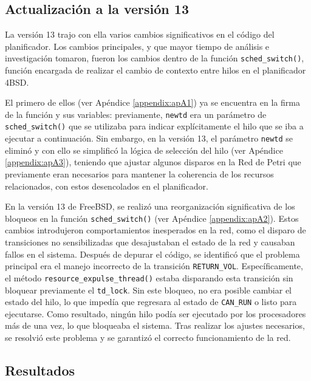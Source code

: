 \subsection{Actualización a la versión 13}

La versión 13 trajo con ella varios cambios significativos en el código del planificador. Los cambios principales, y que mayor tiempo de análisis e investigación tomaron, fueron los cambios dentro de la función \verb|sched_switch()|, función encargada de realizar el cambio de contexto entre hilos en el planificador 4BSD.\par

El primero de ellos (ver Apéndice \ref{appendix:apA1}) ya se encuentra en la firma de la función y sus variables: previamente, \verb|newtd| era un parámetro de \verb|sched_switch()| que se utilizaba para indicar explícitamente el hilo que se iba a ejecutar a continuación. Sin embargo, en la versión 13, el parámetro \verb|newtd| se eliminó y con ello se simplificó la lógica de selección del hilo (ver Apéndice \ref{appendix:apA3}), teniendo que ajustar algunos disparos en la Red de Petri que previamente eran necesarios para mantener la coherencia de los recursos relacionados, con estos desencolados en el planificador.\par

En la versión 13 de FreeBSD, se realizó una reorganización significativa de los bloqueos en la función \verb|sched_switch()| (ver Apéndice \ref{appendix:apA2}). Estos cambios introdujeron comportamientos inesperados en la red, como el disparo de transiciones no sensibilizadas que desajustaban el estado de la red y causaban fallos en el sistema. Después de depurar el código, se identificó que el problema principal era el manejo incorrecto de la transición \verb|RETURN_VOL|. Específicamente, el método \verb|resource_expulse_thread()| estaba disparando esta transición sin bloquear previamente el \verb|td_lock|. Sin este bloqueo, no era posible cambiar el estado del hilo, lo que impedía que regresara al estado de \verb|CAN_RUN| o listo para ejecutarse. Como resultado, ningún hilo podía ser ejecutado por los procesadores más de una vez, lo que bloqueaba el sistema. Tras realizar los ajustes necesarios, se resolvió este problema y se garantizó el correcto funcionamiento de la red.\par

\subsection{Resultados}

